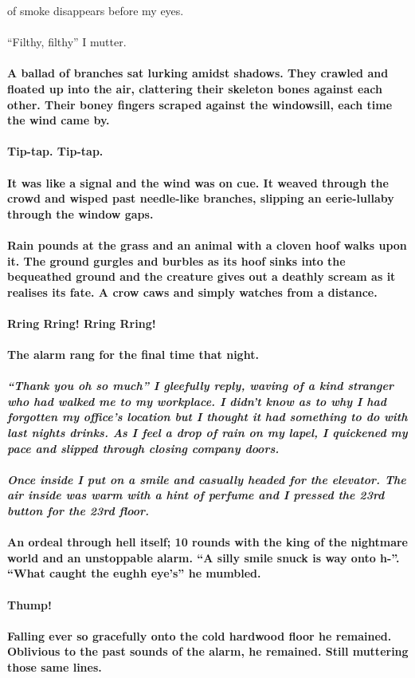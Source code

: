\documentclass{book}
\begin{document}
{{of smoke disappears before my eyes.\\\\``Filthy, filthy'' I mutter.}}


\paragraph{A ballad of branches sat lurking amidst shadows.
They crawled and floated up into the air, clattering their skeleton bones against each other.
Their boney fingers scraped against the windowsill, each time the wind came by.
\\\\Tip-tap. Tip-tap.
\\\\It was like a signal and the wind was on cue.
It weaved through the crowd and wisped past needle-like branches, slipping an eerie-lullaby through the window gaps.
\\\\Rain pounds at the grass and an animal with a cloven hoof walks upon it. 
The ground gurgles and burbles as its hoof sinks into the bequeathed ground and the creature gives out a deathly scream as it realises its fate. A crow caws and simply watches from a distance.
\\\\Rring Rring! Rring Rring!
\\\\The alarm rang for the final time that night.}
\paragraph{\textit{``Thank you oh so much'' I gleefully reply, waving of a kind stranger who had walked me to my workplace. I didn't know as to why I had forgotten my office's location but I thought it had something to do with last nights drinks. As I feel a drop of rain on my lapel, I quickened my pace and slipped through closing company doors.
\\\\Once inside I put on a smile and casually headed for the elevator. The air inside was warm with a hint of perfume and I pressed the 23rd button for the 23rd floor.
}}

\paragraph{
An ordeal through hell itself; 10 rounds with the king of the nightmare world and an unstoppable alarm.
``A silly smile snuck is way onto h-''.
``What caught the eughh eye's'' he mumbled.\\\\Thump!\\\\Falling ever so gracefully onto the cold hardwood floor he remained. Oblivious to the past sounds of the alarm, he remained. Still muttering those same lines.}
\end{document}
